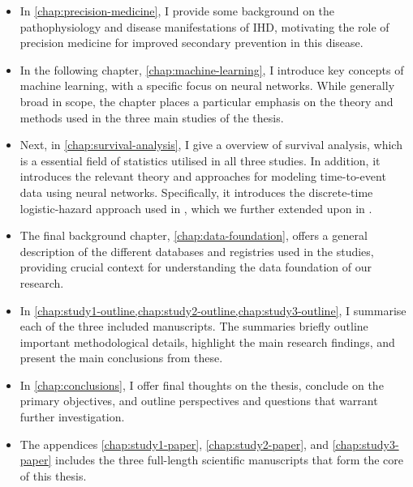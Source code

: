 \begin{itemize} 
    \item In \autoref{chap:precision-medicine},
        I provide some background on the pathophysiology and disease
        manifestations of \ac{IHD}, 
        motivating the role of precision medicine for 
        improved secondary prevention in this disease.

    \item In the following chapter, \autoref{chap:machine-learning}, 
        I introduce key concepts of machine learning, 
        with a specific focus on neural networks. 
        While generally broad in scope, the chapter places a particular 
        emphasis on the theory and methods 
        used in the three main studies of the thesis.

    \item Next, in \autoref{chap:survival-analysis}, I give a
        overview of survival analysis, which is a essential field
        of statistics utilised in all three studies.
        In addition, it introduces the relevant theory
        and approaches for modeling time-to-event data
        using neural networks. 
        Specifically, it introduces the 
        discrete-time logistic-hazard approach used in \studyii{},
        which we further extended upon in \studyiii{}.

    \item The final background chapter,
        \autoref{chap:data-foundation}, offers a general description of 
        the different databases and registries used in the studies,
        providing crucial context for understanding the data foundation 
        of our research.

    \item In \cref{chap:study1-outline,chap:study2-outline,chap:study3-outline},
        I summarise each of the three included manuscripts.
        The summaries briefly outline important methodological details,
        highlight the main research findings, and present the main
        conclusions from these.

    \item In \cref{chap:conclusions}, I offer final thoughts on the thesis,
        conclude on the primary objectives, 
        and outline perspectives and questions
        that warrant further investigation.

    \item The appendices 
        \cref{chap:study1-paper}, 
        \cref{chap:study2-paper}, and
        \cref{chap:study3-paper} 
        includes the three full-length scientific
        manuscripts that form the core of this thesis.
\end{itemize}

